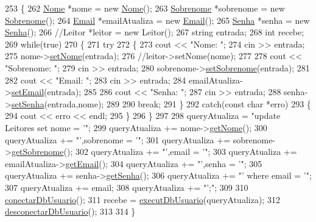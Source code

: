 \begin{DoxyCode}
253 \{
262   \mbox{\hyperlink{class_nome}{Nome}} *nome = \textcolor{keyword}{new} \mbox{\hyperlink{class_nome}{Nome}}();
263   \mbox{\hyperlink{class_sobrenome}{Sobrenome}} *sobrenome = \textcolor{keyword}{new} \mbox{\hyperlink{class_sobrenome}{Sobrenome}}();
264   \mbox{\hyperlink{class_email}{Email}} *emailAtualiza = \textcolor{keyword}{new} \mbox{\hyperlink{class_email}{Email}}();
265   \mbox{\hyperlink{class_senha}{Senha}} *senha = \textcolor{keyword}{new} \mbox{\hyperlink{class_senha}{Senha}}();
266   \textcolor{comment}{//Leitor *leitor = new Leitor();}
267   \textcolor{keywordtype}{string} entrada;
268   \textcolor{keywordtype}{int} recebe;
269   \textcolor{keywordflow}{while}(\textcolor{keyword}{true})
270   \{
271       \textcolor{keywordflow}{try}
272       \{
273         cout << \textcolor{stringliteral}{"Nome: "};
274         cin >> entrada;
275         nome->\mbox{\hyperlink{class_nome_a83b9f56ec9f86f4b976846f4c5c65b30}{setNome}}(entrada);
276         \textcolor{comment}{//leitor->setNome(nome);}
277 
278         cout << \textcolor{stringliteral}{"Sobrenome: "};
279         cin >> entrada;
280         sobrenome->\mbox{\hyperlink{class_sobrenome_a9dc2277e3600656838e47c86dfddd23a}{setSobrenome}}(entrada);
281 
282         cout << \textcolor{stringliteral}{"Email: "};
283         cin >> entrada;
284         emailAtualiza->\mbox{\hyperlink{class_email_a2614b3a19d961411d1bece9c1bdf616f}{setEmail}}(entrada);
285 
286         cout << \textcolor{stringliteral}{"Senha: "};
287         cin >> entrada;
288         senha->\mbox{\hyperlink{class_senha_a01bbc2a82c5f405b68f33fe0dc538ec1}{setSenha}}(entrada,nome);
289 
290         \textcolor{keywordflow}{break};
291       \}
292       \textcolor{keywordflow}{catch}(\textcolor{keyword}{const} \textcolor{keywordtype}{char} *erro)
293       \{
294         cout << erro << endl;
295       \}
296     \}
297 
298   queryAtualiza = \textcolor{stringliteral}{"update Leitores set nome = '"};
299   queryAtualiza += nome->\mbox{\hyperlink{class_nome_aad41176173eec20cbbae1576447a3697}{getNome}}();
300   queryAtualiza += \textcolor{stringliteral}{"',sobrenome = '"};
301   queryAtualiza += sobrenome->\mbox{\hyperlink{class_sobrenome_a954491366ce07f6715f32a97d67edf04}{getSobrenome}}();
302   queryAtualiza += \textcolor{stringliteral}{"',email = '"};
303   queryAtualiza += emailAtualiza->\mbox{\hyperlink{class_email_aa9a0e1a66b4efde65cf017bdd1c6c625}{getEmail}}();
304   queryAtualiza += \textcolor{stringliteral}{"',senha = '"};
305   queryAtualiza += senha->\mbox{\hyperlink{class_senha_a8786b3d03b1652e73df1cdce46cbbaaf}{getSenha}}();
306   queryAtualiza += \textcolor{stringliteral}{"' where email = '"};
307   queryAtualiza += email;
308   queryAtualiza += \textcolor{stringliteral}{"';"};
309 
310   \mbox{\hyperlink{comando_sql_8cpp_a4f89ddcbc4cf8f2587d89f72f8c7900d}{conectarDbUsuario}}();
311   recebe = \mbox{\hyperlink{comando_sql_8cpp_a748197580e7f9acdbf48c78de1f7924b}{executDbUsuario}}(queryAtualiza);
312   \mbox{\hyperlink{comando_sql_8cpp_a969be9911913568e30d4ae8963338bc3}{desconectarDbUsuario}}();
313 
314 \}
\end{DoxyCode}
